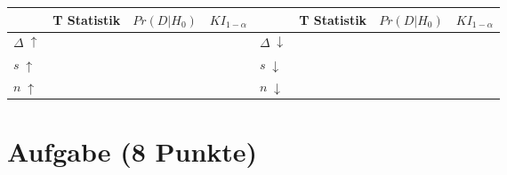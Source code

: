 \documentclass[a4paper, 10pt]{scrartcl}\usepackage[]{graphicx}\usepackage[]{xcolor}
\begin{document}
\begin{center}
  \large
  \begin{tabular}[c]{l|l|l|l|l|l|l|l}
    & T Statistik & $Pr(D|H_0)$ & $KI_{1-\alpha}$ & & T Statistik & $Pr(D|H_0)$ & $KI_{1-\alpha}$\strut\\ 
    \hline
    \textbf{$\Delta\; \uparrow$} & \hspace{2cm} & \hspace{2cm}  & \hspace{2cm} & \textbf{
                                                          $\Delta\; \downarrow$} &
                                                                          \hspace{2cm} & \hspace{2cm}  & \hspace{2cm}\strut\\
    \hline
        \textbf{$s\; \uparrow$} & \hspace{2cm} & \hspace{2cm}  & \hspace{2cm} & \textbf{
                                                          $s\; \downarrow$} &
                                                                          \hspace{2cm}
                                                & \hspace{2cm}  & \hspace{2cm}\strut\\
    \hline
        \textbf{$n\; \uparrow$} & \hspace{2cm} & \hspace{2cm}  & \hspace{2cm} & \textbf{
                                                          $n\; \downarrow$} &
                                                                          \hspace{2cm}
                                                & \hspace{2cm}  & \hspace{2cm}\strut\\
    \hline
  \end{tabular}
\end{center}
 
\clearpage

\section{Aufgabe \hfill (8 Punkte)}
\end{document}
